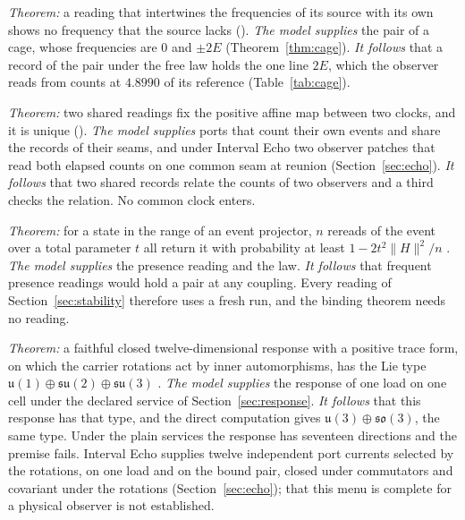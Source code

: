 \documentclass[11pt]{article}
\theoremstyle{definition}
\theoremstyle{remark}
\theoremstyle{plain}
\begin{document}
\begin{description}[leftmargin=1.2em,itemsep=3pt]
\item[Frequencies.] \emph{Theorem:} a reading that intertwines the
frequencies of its source with its own shows no frequency that the source
lacks (). \emph{The model
supplies} the pair of a cage, whose frequencies are $0$ and $\pm2E$
(Theorem~\ref{thm:cage}). \emph{It follows} that a record of the pair
under the free law holds the one line $2E$, which the observer reads from
counts at $4.8990$ of its reference (Table~\ref{tab:cage}).

\item[Clocks.] \emph{Theorem:} two shared readings fix the positive affine
map between two clocks, and it is unique ().
\emph{The model supplies} ports that count their own events and share the
records of their seams, and under Interval Echo two observer patches that
read both elapsed counts on one common seam at reunion
(Section~\ref{sec:echo}). \emph{It follows} that two shared records relate
the counts of two observers and a third checks the relation. No common
clock enters.

\item[Rereads.] \emph{Theorem:} for a state in the range of an event
projector, $n$ rereads of the event over a total parameter $t$ all return
it with probability at least $1-2t^2\lVert H\rVert^2/n$
\cite{ophobservers}. \emph{The model supplies} the presence reading and
the law. \emph{It follows} that frequent presence readings would hold a
pair at any coupling. Every reading of Section~\ref{sec:stability}
therefore uses a fresh run, and the binding theorem needs no reading.

\item[The port response.] \emph{Theorem:} a faithful closed
twelve-dimensional response with a positive trace form, on which the
carrier rotations act by inner automorphisms, has the Lie type
$\mathfrak u(1)\oplus\mathfrak{su}(2)\oplus\mathfrak{su}(3)$ \cite{ophgauge}. \emph{The model supplies}
the response of one load on one cell under the declared service of
Section~\ref{sec:response}. \emph{It follows} that this response has that
type, and the direct computation gives $\mathfrak u(3)\oplus\mathfrak{so}(3)$,
the same type.
Under the plain services the response has seventeen directions and the
premise fails. Interval Echo supplies twelve independent port currents
selected by the rotations, on one load and on the bound pair, closed under
commutators and covariant under the rotations (Section~\ref{sec:echo});
that this menu is complete for a physical observer is not established.
\end{description}
\end{document}
